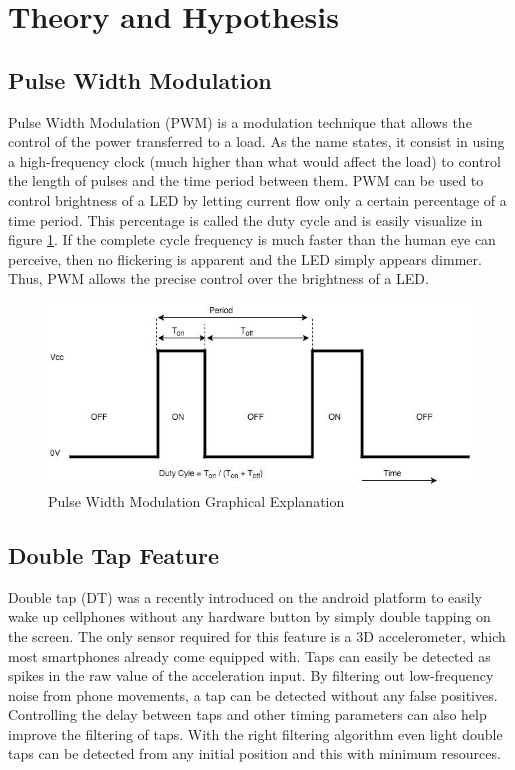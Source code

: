 \documentclass[12pt]{article}
\begin{document}
\section{Theory and Hypothesis}
\subsection{Pulse Width Modulation}
Pulse Width Modulation (PWM) is a modulation technique that allows the control of the power transferred to a load. As the name states, it consist in using a high-frequency clock (much higher than what would affect the load) to control the length of pulses and the time period between them. PWM can be used to control brightness of a LED by letting current flow only a certain percentage of a time period. This percentage is called the duty cycle and is easily visualize in figure \ref{fig:pwm}. If the complete cycle frequency is much faster than the human eye can perceive, then no flickering is apparent and the LED simply appears dimmer. Thus, PWM allows the precise control over the brightness of a LED.

\begin{figure}[!htb]
  \centering
  \includegraphics[scale=0.65]{images/PWM.png}
  \caption{Pulse Width Modulation Graphical Explanation}
  \label{fig:pwm}
 \end{figure}
 
\subsection{Double Tap Feature}
Double tap (DT) was a recently introduced on the android platform to easily wake up cellphones without any hardware button by simply double tapping on the screen. The only sensor required for this feature is a 3D accelerometer, which most smartphones already come equipped with. Taps can easily be detected as spikes in the raw value of the acceleration input. By filtering out low-frequency noise from phone movements, a tap can be detected without any false positives. Controlling the delay between taps and other timing parameters can also help improve the filtering of taps. With the right filtering algorithm even light double taps can be detected from any initial position and this with minimum resources. 
\end{document}
